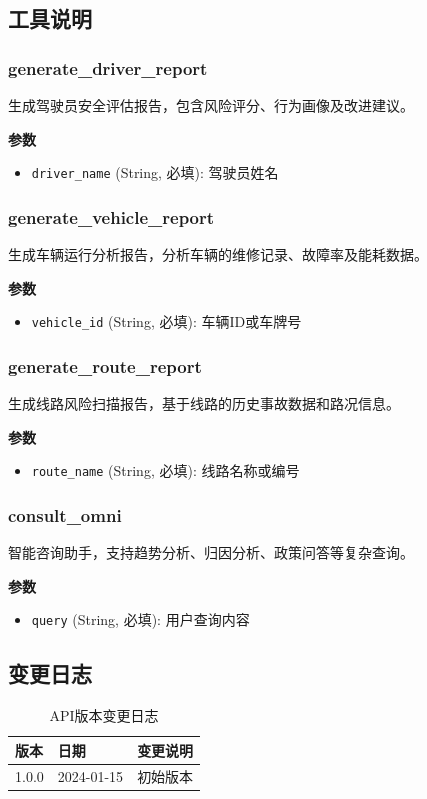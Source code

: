 \documentclass[12pt,a4paper]{article}
\begin{document}
\subsection{工具说明}

\subsubsection{generate\_driver\_report}

生成驾驶员安全评估报告，包含风险评分、行为画像及改进建议。

\textbf{参数}

\begin{itemize}
  \item \texttt{driver\_name} (String, 必填): 驾驶员姓名
\end{itemize}

\subsubsection{generate\_vehicle\_report}

生成车辆运行分析报告，分析车辆的维修记录、故障率及能耗数据。

\textbf{参数}

\begin{itemize}
  \item \texttt{vehicle\_id} (String, 必填): 车辆ID或车牌号
\end{itemize}

\subsubsection{generate\_route\_report}

生成线路风险扫描报告，基于线路的历史事故数据和路况信息。

\textbf{参数}

\begin{itemize}
  \item \texttt{route\_name} (String, 必填): 线路名称或编号
\end{itemize}

\subsubsection{consult\_omni}

智能咨询助手，支持趋势分析、归因分析、政策问答等复杂查询。

\textbf{参数}

\begin{itemize}
  \item \texttt{query} (String, 必填): 用户查询内容
\end{itemize}

\subsection{变更日志}

\begin{table}[h]
  \centering
  \begin{tabular}{lll}
    \toprule
    版本 & 日期 & 变更说明 \\
    \midrule
    1.0.0 & 2024-01-15 & 初始版本 \\
    \bottomrule
  \end{tabular}
  \caption{API版本变更日志}
\end{table}
\end{document}
